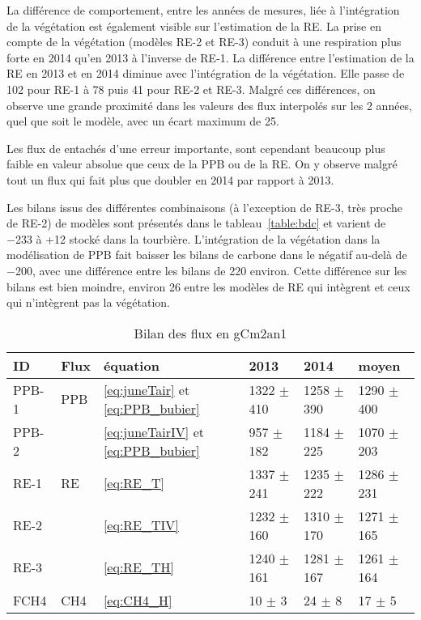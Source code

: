 La différence de comportement, entre les années de mesures, liée à l'intégration de la végétation est également visible sur l'estimation de la RE.
La prise en compte de la végétation (modèles RE-2 et RE-3) conduit à une respiration plus forte en 2014 qu'en 2013 à l'inverse de RE-1.
La différence entre l'estimation de la RE en 2013 et en 2014 diminue avec l'intégration de la végétation.
Elle passe de 102 pour RE-1 à 78 puis 41 pour RE-2 et RE-3.
Malgré ces différences, on observe une grande proximité dans les valeurs des flux interpolés sur les 2 années, quel  que soit le modèle, avec un écart maximum de \SI{25}{\gcma}.

Les flux de \chh entachés d'une erreur importante, sont cependant beaucoup plus faible en valeur absolue que ceux de la PPB ou de la RE.
On y observe malgré tout un flux qui fait plus que doubler en 2014 par rapport à 2013.

Les bilans issus des différentes combinaisons (à l'exception de RE-3, très proche de RE-2) de modèles sont présentés dans le tableau~\ref{table:bdc} et varient de \SI{-233}{\gcma} à +\SI{12}{\gcma} stocké dans la tourbière.
L'intégration de la végétation dans la modélisation de PPB fait baisser les bilans de carbone dans le négatif au-delà de \SI{-200}{\gcma}, avec une différence entre les bilans de \SI{220}{\gcma} environ.
Cette différence sur les bilans est bien moindre, environ \SI{26}{\gcma} entre les modèles de RE qui intègrent et ceux qui n’intègrent pas la végétation.

\begin{table}
\centering
\caption{Bilan des flux en gCm2an1}
\label{table:flux}
\begin{tabular}{llllll}\toprule
ID & Flux & équation & 2013 & 2014 & moyen \\ \midrule
PPB-1 & PPB & \ref{eq:juneTair} et \ref{eq:PPB_bubier} & 1322 $\pm$ 410 & 1258 $\pm$ 390 & 1290 $\pm$ 400 \\
PPB-2 & & \ref{eq:juneTairIV} et \ref{eq:PPB_bubier} & 957 $\pm$ 182 & 1184 $\pm$ 225 & 1070 $\pm$ 203 \\[+1.5ex]
RE-1 & RE & \ref{eq:RE_T} & 1337 $\pm$ 241 & 1235 $\pm$ 222 & 1286 $\pm$ 231 \\
RE-2 & & \ref{eq:RE_TIV} & 1232 $\pm$ 160 & 1310 $\pm$ 170 & 1271 $\pm$ 165\\
RE-3 & & \ref{eq:RE_TH} & 1240 $\pm$ 161 & 1281 $\pm$ 167 & 1261 $\pm$ 164 \\[+1.5ex]
FCH4 & CH4 & \ref{eq:CH4_H} & 10 $\pm$ 3 & 24 $\pm$ 8 & 17 $\pm$ 5 \\
\bottomrule
\end{tabular}
\end{table}


